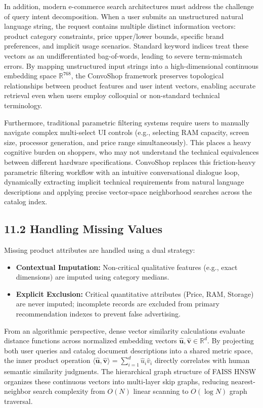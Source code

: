 \documentclass[12pt,a4paper]{article}
\begin{document}
In addition, modern e-commerce search architectures must address the challenge of query intent decomposition. When a user submits an unstructured natural language string, the request contains multiple distinct information vectors: product category constraints, price upper/lower bounds, specific brand preferences, and implicit usage scenarios. Standard keyword indices treat these vectors as an undifferentiated bag-of-words, leading to severe term-mismatch errors. By mapping unstructured input strings into a high-dimensional continuous embedding space $\mathbb{R}^{768}$, the ConvoShop framework preserves topological relationships between product features and user intent vectors, enabling accurate retrieval even when users employ colloquial or non-standard technical terminology.

Furthermore, traditional parametric filtering systems require users to manually navigate complex multi-select UI controls (e.g., selecting RAM capacity, screen size, processor generation, and price range simultaneously). This places a heavy cognitive burden on shoppers, who may not understand the technical equivalences between different hardware specifications. ConvoShop replaces this friction-heavy parametric filtering workflow with an intuitive conversational dialogue loop, dynamically extracting implicit technical requirements from natural language descriptions and applying precise vector-space neighborhood searches across the catalog index.

\subsection*{11.2 Handling Missing Values}
\label{sec:11.2}
Missing product attributes are handled using a dual strategy:
\begin{itemize}
    \item \textbf{Contextual Imputation:} Non-critical qualitative features (e.g., exact dimensions) are imputed using category medians.
    \item \textbf{Explicit Exclusion:} Critical quantitative attributes (Price, RAM, Storage) are never imputed; incomplete records are excluded from primary recommendation indexes to prevent false advertising.
\end{itemize}



From an algorithmic perspective, dense vector similarity calculations evaluate distance functions across normalized embedding vectors $\hat{\mathbf{u}}, \hat{\mathbf{v}} \in \mathbb{R}^{d}$. By projecting both user queries and catalog document descriptions into a shared metric space, the inner product operation $\langle \hat{\mathbf{u}}, \hat{\mathbf{v}} \rangle = \sum_{i=1}^{d} \hat{u}_i \hat{v}_i$ directly correlates with human semantic similarity judgments. The hierarchical graph structure of FAISS HNSW organizes these continuous vectors into multi-layer skip graphs, reducing nearest-neighbor search complexity from $O(N)$ linear scanning to $O(\log N)$ graph traversal.
\end{document}
